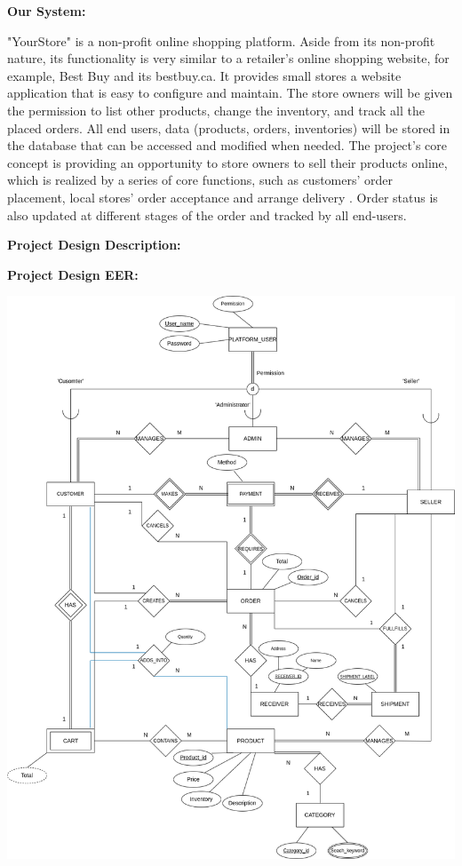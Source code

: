 \documentclass[12pt]{article}
\begin{document}
\vspace*{10mm}

\textbf{Our System:}
\vspace*{5mm}

"YourStore" is a non-profit online shopping platform. Aside from its non-profit nature, its functionality is very similar to a retailer’s online shopping website, for example, Best Buy and its bestbuy.ca. It provides small stores a website 
application that is easy to configure and maintain. The store owners will be given the permission to list other products, change the inventory, and track all the placed orders. All end users, data (products, orders, inventories) will be stored 
in the database that can be accessed and modified when needed. The project’s core concept is providing an opportunity to store owners to sell their products online, which is realized by a series of core functions, such as customers' order placement, local stores' 
order acceptance and arrange delivery . Order status is also updated at different stages of the order and tracked by all end-users.

\newpage 
\textbf{Project Design Description:}










\newpage 
\textbf{Project Design EER:}

\includegraphics[height=.80\textheight]{Diagrams/onlineShopping_revised.png}
\end{document}
